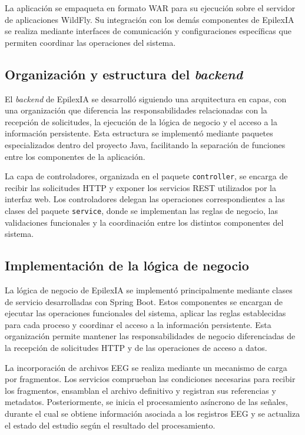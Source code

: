 La aplicación se empaqueta en formato WAR para
su ejecución sobre el servidor de aplicaciones
WildFly. Su integración con los demás componentes
de EpilexIA se realiza mediante interfaces de
comunicación y configuraciones específicas
que permiten coordinar las operaciones del sistema.

\subsection{Organización y estructura del \textit{backend}}

El \textit{backend} de EpilexIA se desarrolló siguiendo una
arquitectura en capas, con una organización que
diferencia las responsabilidades relacionadas con
la recepción de solicitudes, la ejecución de la
lógica de negocio y el acceso a la información
persistente. Esta estructura se implementó mediante
paquetes especializados dentro del proyecto Java,
facilitando la separación de funciones entre los
componentes de la aplicación.

La capa de controladores, organizada en el paquete
\texttt{controller}, se encarga de recibir las
solicitudes HTTP y exponer los servicios REST
utilizados por la interfaz web. Los controladores
delegan las operaciones correspondientes a las
clases del paquete \texttt{service}, donde se
implementan las reglas de negocio, las validaciones
funcionales y la coordinación entre los distintos
componentes del sistema.

\subsection{Implementación de la lógica de negocio}

La lógica de negocio de EpilexIA se implementó
principalmente mediante clases de servicio
desarrolladas con Spring Boot. Estos componentes
se encargan de ejecutar las operaciones
funcionales del sistema, aplicar las reglas
establecidas para cada proceso y coordinar
el acceso a la información persistente.
Esta organización permite mantener las
responsabilidades de negocio diferenciadas
de la recepción de solicitudes HTTP y de
las operaciones de acceso a datos.

La incorporación de archivos EEG se realiza
mediante un mecanismo de carga por fragmentos.
Los servicios comprueban las condiciones
necesarias para recibir los fragmentos,
ensamblan el archivo definitivo y registran
sus referencias y metadatos. Posteriormente,
se inicia el procesamiento asíncrono de
las señales, durante el cual se obtiene
información asociada a los registros EEG
y se actualiza el estado del estudio
según el resultado del procesamiento.

